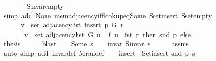 \begin{isabellebody}
\ \ \ \ \ \ \isamarkupfalse%
\ S{\isachardot}{\kern0pt}invar{\isacharunderscore}{\kern0pt}empty\isanewline
\ \ \ \ \ \ \isamarkupfalse%
\ {\isacharparenleft}{\kern0pt}simp\ add{\isacharcolon}{\kern0pt}\ None\ mem{\isacharunderscore}{\kern0pt}adjacency{\isacharunderscore}{\kern0pt}iff{\isacharunderscore}{\kern0pt}lookup{\isacharunderscore}{\kern0pt}eq{\isacharunderscore}{\kern0pt}Some\ S{\isachardot}{\kern0pt}set{\isacharunderscore}{\kern0pt}insert\ S{\isachardot}{\kern0pt}set{\isacharunderscore}{\kern0pt}empty{\isacharparenright}{\kern0pt}\isanewline
\ \ \ \ \isamarkupfalse%
\ \isamarkupfalse%
\isanewline
\ \ \ \ \ \ {\isachardoublequoteopen}v\ {\isasymin}\ set\ {\isacharparenleft}{\kern0pt}adjacency{\isacharunderscore}{\kern0pt}list\ {\isacharparenleft}{\kern0pt}insert\ p\ G{\isacharparenright}{\kern0pt}\ u{\isacharparenright}{\kern0pt}\ {\isasymlongleftrightarrow}\isanewline
\ \ \ \ \ \ \ v\ {\isasymin}\ set\ {\isacharparenleft}{\kern0pt}adjacency{\isacharunderscore}{\kern0pt}list\ G\ u{\isacharparenright}{\kern0pt}\ {\isasymunion}\ {\isacharparenleft}{\kern0pt}if\ u\ {\isacharequal}{\kern0pt}\ fst\ p\ then\ {\isacharbraceleft}{\kern0pt}snd\ p{\isacharbraceright}{\kern0pt}\ else\ {\isacharbraceleft}{\kern0pt}{\isacharbraceright}{\kern0pt}{\isacharparenright}{\kern0pt}{\isachardoublequoteclose}\isanewline
\ \ \ \ \ \ \isacommand{{\isachardot}{\kern0pt}}\isamarkupfalse%
\ \isacommand{{\isacharbraceright}{\kern0pt}}\isamarkupfalse%
\isanewline
\ \ \isamarkupfalse%
\ {\isacharquery}{\kern0pt}thesis\isanewline
\ \ \ \ \isamarkupfalse%
\ blast\isanewline
{}\isamarkupfalse%
\isanewline
\ \ \isamarkupfalse%
\ {\isacharparenleft}{\kern0pt}Some\ s{\isacharparenright}{\kern0pt}\isanewline
\ \ \isamarkupfalse%
\ invar{\isacharcolon}{\kern0pt}\ {\isachardoublequoteopen}S{\isachardot}{\kern0pt}invar\ s{\isachardoublequoteclose}\isanewline
\ \ \ \ \isamarkupfalse%
\ assms\isanewline
\ \ \ \ \isamarkupfalse%
\ {\isacharparenleft}{\kern0pt}auto\ simp\ add{\isacharcolon}{\kern0pt}\ invar{\isacharunderscore}{\kern0pt}def\ M{\isachardot}{\kern0pt}ran{\isacharunderscore}{\kern0pt}def{\isacharparenright}{\kern0pt}\isanewline
\ \ \isamarkupfalse%
\ {\isacharquery}{\kern0pt}insert\ {\isacharequal}{\kern0pt}\ {\isachardoublequoteopen}Set{\isacharunderscore}{\kern0pt}insert\ {\isacharparenleft}{\kern0pt}snd\ p{\isacharparenright}{\kern0pt}\ s{\isachardoublequoteclose}\isanewline
\ \ \isacommand{{\isacharbraceleft}{\kern0pt}}\isamarkupfalse%

\end{isabellebody}
